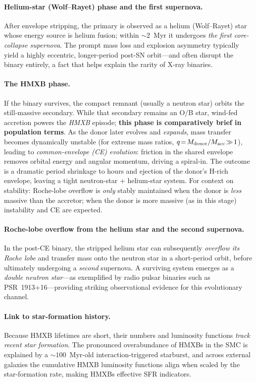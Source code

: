 \paragraph{Helium-star (Wolf–Rayet) phase and the first supernova.}
After envelope stripping, the primary is observed as a helium (Wolf–Rayet) star whose energy source is helium fusion; within $\sim 2$~Myr it undergoes \emph{the first core-collapse supernova}. The prompt mass loss and explosion asymmetry typically yield a highly eccentric, longer-period post-SN orbit—and often disrupt the binary entirely, a fact that helps explain the rarity of X-ray binaries.

\paragraph{The HMXB phase.}
If the binary survives, the compact remnant (usually a neutron star) orbits the still-massive secondary. While that secondary remains an O/B star, wind-fed accretion powers the \emph{HMXB} episode; \textbf{this phase is comparatively brief in population terms}. As the donor later evolves and \emph{expands}, mass transfer becomes dynamically unstable (for extreme mass ratios, $q\!=\!M_{\rm donor}/M_{\rm acc}\!\gg\!1$), leading to \emph{common-envelope (CE) evolution}: friction in the shared envelope removes orbital energy and angular momentum, driving a spiral-in. The outcome is a dramatic period shrinkage to hours and ejection of the donor’s H-rich envelope, leaving a tight neutron-star + helium-star system. For context on stability: Roche-lobe overflow is \emph{only} stably maintained when the donor is \emph{less} massive than the accretor; when the donor is more massive (as in this stage) instability and CE are expected.

\paragraph{Roche-lobe overflow from the helium star and the second supernova.}
In the post-CE binary, the stripped helium star can subsequently \emph{overflow its Roche lobe} and transfer mass onto the neutron star in a short-period orbit, before ultimately undergoing a \emph{second} supernova. A surviving system emerges as a \emph{double neutron star}—as exemplified by radio pulsar binaries such as PSR~1913+16—providing striking observational evidence for this evolutionary channel. 

\paragraph{Link to star-formation history.}
Because HMXB lifetimes are short, their numbers and luminosity functions \emph{track recent star formation}. The pronounced overabundance of HMXBs in the SMC is explained by a $\sim 100$~Myr-old interaction-triggered starburst, and across external galaxies the cumulative HMXB luminosity functions align when scaled by the star-formation rate, making HMXBs effective SFR indicators.

